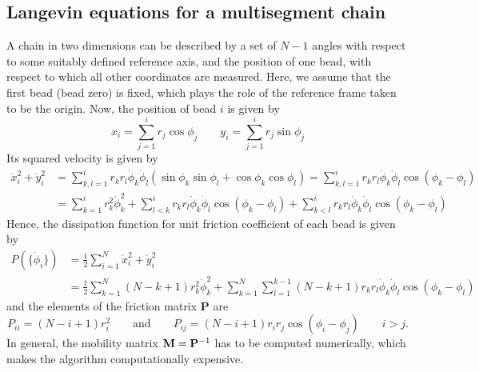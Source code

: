 \subsection{Langevin equations for a multisegment chain}
A chain in two dimensions can be described by a set of $N-1$ angles with respect to some suitably defined reference axis, and the position of one bead, with respect to which all other coordinates are measured.
Here, we assume that the first bead (bead zero) is fixed, which plays the role of the reference frame taken to be the origin. Now, the position of bead $i$ is given by
\begin{equation}
x_i=\sum_{j=1}^i r_j \cos \phi_j \qquad y_i=\sum_{j=1}^i r_j \sin \phi_j
\end{equation}
Its squared velocity is given by
\begin{equation}
\begin{split}
\dot{x}_i^2+\dot{y}_i^2&=\sum_{k,l=1}^i r_k r_l \dot{\phi}_k\dot{\phi}_l(\sin \phi_k\sin \phi_l+\cos \phi_k \cos\phi_l)=\sum_{k,l=1}^i r_k r_l \dot{\phi}_k\dot{\phi}_l\cos (\phi_k-\phi_l)\\
&=\sum_{k=1}^i r_k ^2 \dot{\phi}_k^2+\sum_{l<k}^i r_k r_l\dot{\phi}_k\dot{\phi}_l \cos (\phi_k-\phi_l)+ \sum_{k<l}^i r_k r_l\dot{\phi}_k\dot{\phi}_l \cos (\phi_k-\phi_l)
\end{split}
 \end{equation}
Hence, the dissipation function for unit friction coefficient of each bead is given by
 \begin{equation}
\begin{split}
P(\{\dot{\phi}_i\})&=\frac{1}{2}\sum_{i=1}^N \dot{x}_i^2+\dot{y}_i^2\\
&=\frac{1}{2}\sum_{k=1}^N (N-k+1) r_k ^2 \dot{\phi}_k^2
+\sum_{k=1}^N \sum_{l=1}^{k-1}(N-k+1) r_k r_l\dot{\phi}_k\dot{\phi}_l \cos (\phi_k-\phi_l)
\end{split}
 \end{equation}
and the elements of the friction matrix $\mathbf{P}$ are
\begin{equation}
P_{ii}=(N-i+1) r_i ^2   \qquad \mathrm{and} \qquad P_{ij}=(N-i+1) r_i r_j \cos(\phi_i-\phi_j)\qquad i>j.
\end{equation}
In general, the mobility matrix $\mathbf{M}=\mathbf{P}^{-1}$ has to be computed numerically, which 
makes the algorithm computationally expensive. 
